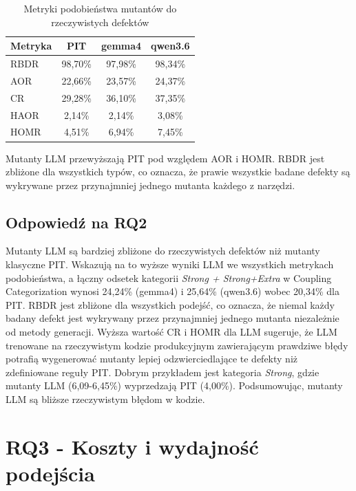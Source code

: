 \documentclass[12pt,a4paper,oldfontcommands]{memoir}
\theoremstyle{plain}
\theoremstyle{definition}
\theoremstyle{remark}
\begin{document}
    \begin{table}[H]
        \centering
        \begin{tabular}{|l|c|c|c|}
            \hline
            Metryka & PIT & gemma4 & qwen3.6 \\ \hline
            RBDR & 98,70\% & 97,98\% & 98,34\% \\ \hline
            AOR & 22,66\% & 23,57\% & 24,37\% \\ \hline
            CR & 29,28\% & 36,10\% & 37,35\% \\ \hline
            HAOR & 2,14\% & 2,14\% & 3,08\% \\ \hline
            HOMR & 4,51\% & 6,94\% & 7,45\% \\ \hline
        \end{tabular}
        \caption{Metryki podobieństwa mutantów do rzeczywistych defektów}
        \label{tab:podobienstwo}
    \end{table}

    Mutanty LLM przewyższają PIT pod względem AOR i HOMR.
    RBDR jest zbliżone dla wszystkich typów, co oznacza, że prawie wszystkie badane defekty są wykrywane przez przynajmniej jednego mutanta każdego z narzędzi.

    \subsection{Odpowiedź na RQ2}

    Mutanty LLM są bardziej zbliżone do rzeczywistych defektów niż mutanty klasyczne PIT.
    Wskazują na to wyższe wyniki LLM we wszystkich metrykach podobieństwa, a łączny odsetek kategorii \textit{Strong + Strong+Extra} w Coupling Categorization wynosi 24,24\% (gemma4) i 25,64\% (qwen3.6) wobec 20,34\% dla PIT.
    RBDR jest zbliżone dla wszystkich podejść, co oznacza, że niemal każdy badany defekt jest wykrywany przez przynajmniej jednego mutanta niezależnie od metody generacji.
    Wyższa wartość CR i HOMR dla LLM sugeruje, że LLM trenowane na rzeczywistym kodzie produkcyjnym zawierającym prawdziwe błędy potrafią wygenerować mutanty lepiej odzwierciedlające te defekty niż zdefiniowane reguły PIT.
    Dobrym przykładem jest kategoria \textit{Strong}, gdzie mutanty LLM (6,09-6,45\%) wyprzedzają PIT (4,00\%).
    Podsumowując, mutanty LLM są bliższe rzeczywistym błędom w kodzie.

    \section{RQ3 - Koszty i wydajność podejścia}
\end{document}
